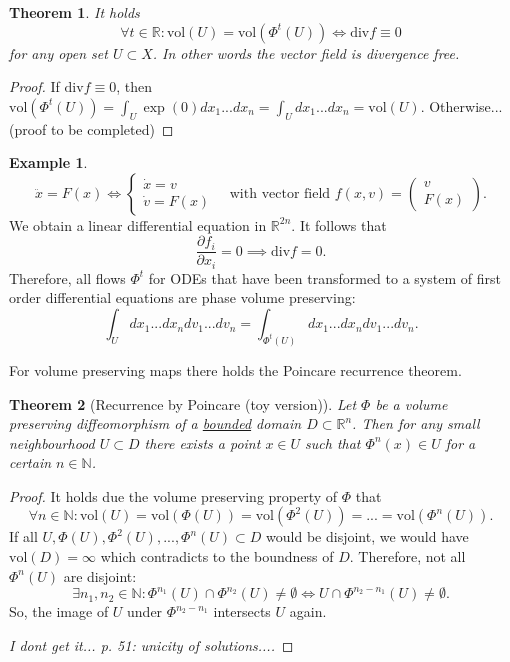 \documentclass[hidelinks,a4paper, 11pt]{article}
\theoremstyle{plain}
\newtheorem{theorem}{Theorem}
\theoremstyle{break}
\theoremstyle{plain}
\theoremstyle{definition}
\newtheorem*{example}{Example}
\begin{document}
\begin{theorem}
	It holds
	\[
		\forall t \in \mathbb R: \mathrm{vol}(U) = \mathrm{vol}(\Phi^t(U)) \iff \mathrm{div} f \equiv 0
	\]
	for any open set $U \subset X$. In other words the vector field is divergence free.
\end{theorem}
\begin{proof}
	If $\mathrm{div}f \equiv 0$, then $\mathrm{vol}(\Phi^t(U)) = \int_U \exp(0) dx_1...dx_n= \int_U  dx_1...dx_n = \mathrm{vol}(U)$. Otherwise... (proof to be completed)
\end{proof}

\begin{example}
	\[
		\ddot x = F(x) \iff \begin{cases}
			\dot x = v \\ \dot v = F(x)
		\end{cases} \quad \text{with vector field } f(x,v) = \begin{pmatrix}
			v \\ F(x)
		\end{pmatrix}.
	\]
	We obtain a linear differential equation in $\mathbb R^{2n}$. It follows that
	\[
		\frac{\partial f_i}{\partial x_i} = 0 \implies \mathrm{div} f = 0.
	\]
	Therefore, all flows $\Phi^t$ for ODEs that have been transformed to a system of first order differential equations are phase volume preserving:
	\[
		\int_U dx_1...dx_n dv_1...dv_n = \int_{\Phi^t(U)}dx_1...dx_ndv_1...dv_n.
	\]
\end{example}

For volume preserving maps there holds the Poincare recurrence theorem.

\begin{theorem}[Recurrence by Poincare (toy version)]
	Let $\Phi$ be a volume preserving diffeomorphism of a \underline{bounded} domain $D \subset \mathbb R^n$. Then for any small neighbourhood $U \subset D$ there exists a point $x \in U$ such that $\Phi^n(x) \in U$ for a certain $n \in \mathbb N$.
\end{theorem}

\begin{proof}
	It holds due the volume preserving property of $\Phi$ that
	\[
		\forall n \in \mathbb N: \mathrm{vol}(U) = \mathrm{vol}(\Phi(U)) = \mathrm{vol}(\Phi^2(U))  =  ... = \mathrm{vol}(\Phi^n(U)).
	\]
	If all $U, \Phi(U), \Phi^2(U),..., \Phi^n(U) \subset D$ would be disjoint, we would have $\mathrm{vol}(D) = \infty$ which contradicts to the boundness of $D$. Therefore, not all $\Phi^n(U)$ are disjoint:
	\[
		\exists n_1,n_2 \in \mathbb N: \Phi^{n_1}(U) \cap \Phi^{n_2}(U) \neq \emptyset \iff U \cap \Phi^{n_2-n_1}(U) \neq \emptyset.
	\]
	So, the image of $U$ under $\Phi^{n_2-n_1}$ intersects $U$ again.
	
	\textit{I dont get it... p. 51: unicity of solutions....}
\end{proof}
\end{document}
